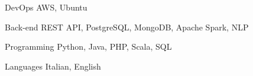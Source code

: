 

\begin{cvskills}

  \cvskill
    {DevOps} %
    {AWS, Ubuntu} %

  \cvskill
    {Back-end} %
    {REST API, PostgreSQL, MongoDB, Apache Spark, NLP} %

  \cvskill
    {Programming} %
    {Python, Java, PHP, Scala, SQL} %

  \cvskill
    {Languages} %
    {Italian, English} %

\end{cvskills}

